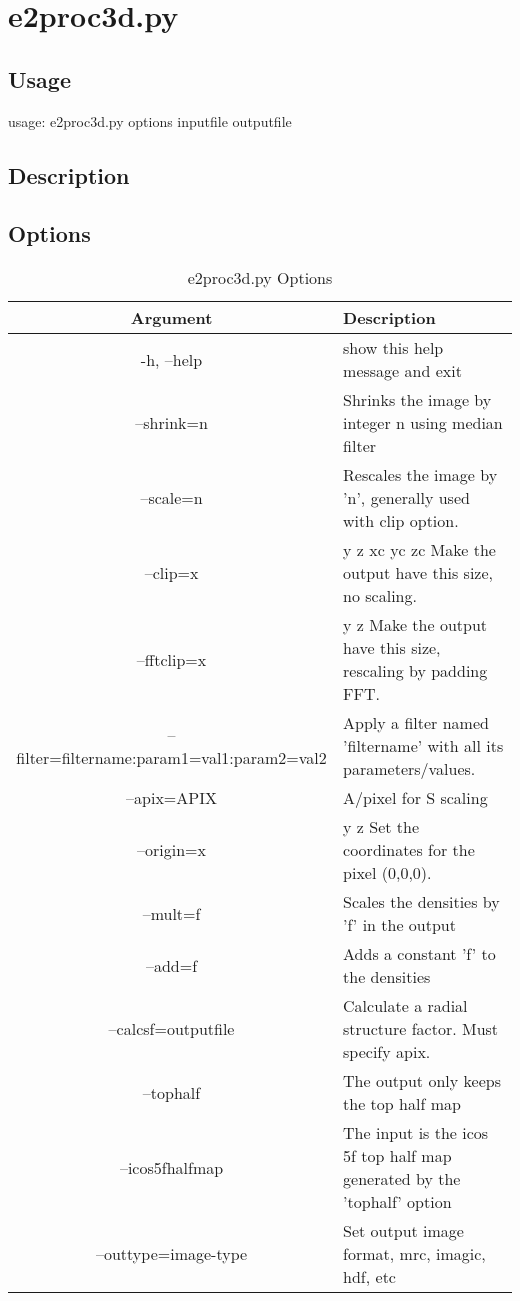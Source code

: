 \section{e2proc3d.py}  \label{e2proc3d.py}
\subsection{Usage}
usage: e2proc3d.py options inputfile outputfile


\subsection{Description}

\subsection{Options}

\begin{longtable}{|c||p{3.5in}|}
\hline \bf{Argument} & \bf{Description}\endhead
\hline \multicolumn{2}{r}{{Continued on next page}} \endfoot
\hline \hline \caption[e2proc3d.py Options]{e2proc3d.py Options}\endlastfoot
\\\hline   -h, --help  &  show this help message and exit
\\\hline   --shrink=n  &  Shrinks the image by integer n using median filter
\\\hline   --scale=n  &  Rescales the image by 'n', generally used with clip option.
\\\hline   --clip=x  &  y z xc yc zc Make the output have this size, no scaling.
\\\hline   --fftclip=x  &  y z Make the output have this size, rescaling by padding FFT.
\\\hline   --filter=filtername:param1=val1:param2=val2  &  Apply a filter named 'filtername' with all its parameters/values.
\\\hline   --apix=APIX  &  A/pixel for S scaling
\\\hline   --origin=x  &  y z Set the coordinates for the pixel (0,0,0).
\\\hline   --mult=f  &  Scales the densities by 'f' in the output
\\\hline   --add=f  &  Adds a constant 'f' to the densities
\\\hline   --calcsf=outputfile  &  Calculate a radial structure factor. Must specify apix.
\\\hline   --tophalf  &  The output only keeps the top half map
\\\hline   --icos5fhalfmap  &  The input is the icos 5f top half map generated by the 'tophalf' option
\\\hline
 --outtype=image-type  &  Set output image format, mrc, imagic, hdf, etc
\\\hline
\end{longtable}
